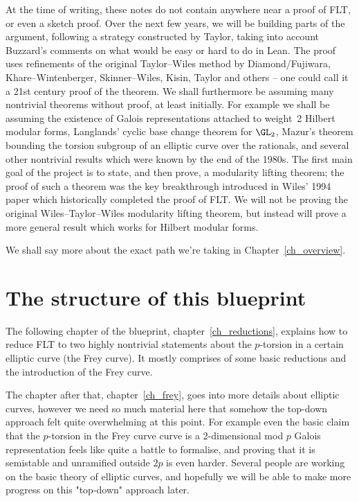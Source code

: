 At the time of writing, these notes do not contain anywhere near a proof of FLT, or even a sketch proof.
Over the next few years, we will be building parts of the argument, following a strategy
constructed by Taylor, taking into account Buzzard's comments on what would be easy or hard to do
in Lean. The proof uses refinements of the original Taylor--Wiles method by Diamond/Fujiwara,
Khare--Wintenberger, Skinner--Wiles, Kisin, Taylor and others -- one could call it a 21st century
proof of the theorem. We shall furthermore be assuming many nontrivial theorems without proof,
at least initially. For example we shall be assuming the existence of Galois representations
attached to weight~2 Hilbert modular forms, Langlands' cyclic base change theorem for $\GL_2$,
Mazur's theorem bounding the torsion subgroup of an elliptic curve over the rationals, and
several other nontrivial results which were known by the end of the 1980s. The first main goal
of the project is to state, and then prove, a modularity lifting theorem; the proof of such a theorem
was the key breakthrough introduced in Wiles' 1994 paper which historically completed the proof
of FLT. We will not be proving the original Wiles--Taylor--Wiles modularity lifting theorem, but
instead will prove a more general result which works for Hilbert modular forms.

We shall say more about the exact path we're taking in
Chapter~\ref{ch_overview}.

\section{The structure of this blueprint}

The following chapter of the blueprint, chapter~\ref{ch_reductions}, explains how to reduce FLT
to two highly nontrivial statements about the $p$-torsion in a certain elliptic curve (the Frey curve).
It mostly comprises of some basic reductions and the introduction of the Frey curve.

The chapter after that, chapter~\ref{ch_frey}, goes into more details about elliptic curves,
however we need so much material here that somehow the top-down approach felt quite overwhelming
at this point. For example even the basic claim that the $p$-torsion in the Frey curve curve is
a 2-dimensional mod $p$ Galois representation feels like quite a battle to formalise,
and proving that it is semistable and unramified outside $2p$ is even harder.
Several people are working on the basic theory of elliptic curves, and hopefully
we will be able to make more progress on this "top-down" approach later.

